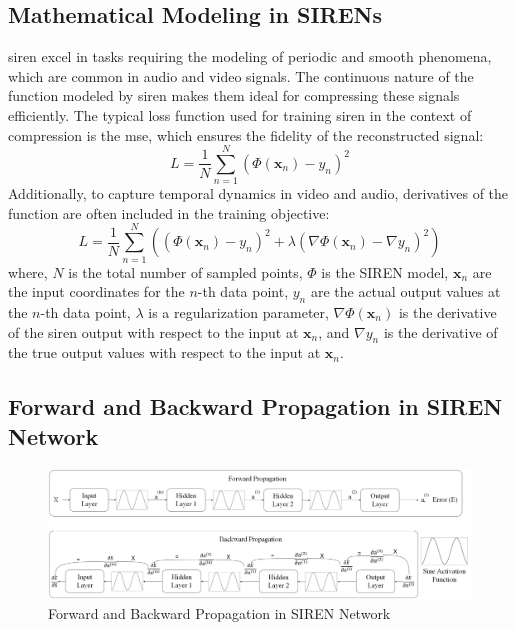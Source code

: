\documentclass{ioereport}
\begin{document}
\subsection{Mathematical Modeling in SIRENs}
\gls{siren} excel in tasks requiring the modeling of periodic and smooth phenomena, which are common in audio and video signals. The continuous nature of the function modeled by \gls{siren} makes them ideal for compressing these signals efficiently. The typical loss function used for training \gls{siren} in the context of compression is the \gls{mse}, which ensures the fidelity of the reconstructed signal:
\begin{equation}
    L = \frac{1}{N} \sum_{n=1}^N (\Phi(\mathbf{x}_n) - y_n)^2 
\end{equation}
Additionally, to capture temporal dynamics in video and audio, derivatives of the function are often included in the training objective:
\begin{equation}
    L = \frac{1}{N} \sum_{n=1}^N \left((\Phi(\mathbf{x}_n) - y_n)^2 + \lambda (\nabla\Phi(\mathbf{x}_n) - \nabla y_n)^2\right) 
\end{equation}
where, \( N \) is the total number of sampled points, \( \Phi \) is the SIREN model, \( \mathbf{x}_n \) are the input coordinates for the \(n\)-th data point, \( y_n \) are the actual output values at the \(n\)-th data point, \( \lambda \) is a regularization parameter, \( \nabla\Phi(\mathbf{x}_n) \) is the derivative of the \gls{siren} output with respect to the input at \( \mathbf{x}_n \), and \( \nabla y_n \) is the derivative of the true output values with respect to the input at \( \mathbf{x}_n \).


\subsection{Forward and Backward Propagation in SIREN Network}
\begin{figure}[H]
    \centering
    \includegraphics[width=\linewidth]{assets/Propagation concept figure Major Project.png}
    \caption{Forward and Backward Propagation in SIREN Network}
    \label{fig:propagation-diagram}
\end{figure}
\end{document}
